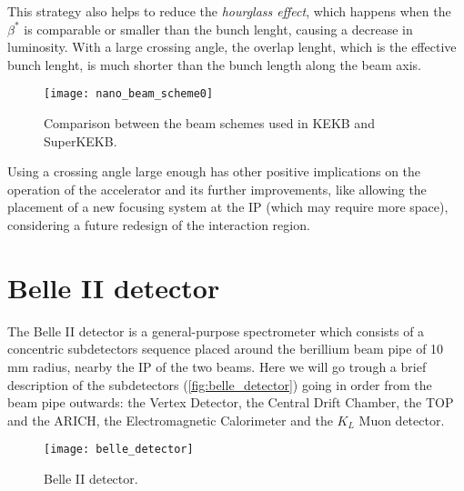 This strategy also helps to reduce the \textit{hourglass effect}, which happens when the $\beta^{*}$ is comparable or smaller than the bunch lenght, causing a decrease in luminosity. With a large crossing angle, the overlap lenght, which is the effective bunch lenght, is much shorter than the bunch length along the beam axis. \\


\begin{figure}[h!]
\centering
\texttt{[image: nano\_beam\_scheme0]}
\caption{Comparison between the beam schemes used in KEKB and SuperKEKB.}
\label{fig:beam_scheme_comparison}
\end{figure}

Using a crossing angle large enough has other positive implications on the operation of the accelerator and its further improvements, like allowing the placement of a new focusing system at the IP (which may require more space), considering a future redesign of the interaction region.

\begin{comment}
In~\autoref{fig:beampar} are reported the main machine parameters (default value) of the SuperKEKB accelerator.

\begin{figure}[h!]
\centering
\texttt{[image: beam\_par]}
\caption{Machine parameters of SuperKEKB. The mark ''*'' indicate values in the IP.}
\label{fig:beampar}
\end{figure}
\end{comment}


\section{Belle II detector}


The Belle II detector is a general-purpose spectrometer which consists of a concentric subdetectors sequence placed around the berillium beam pipe of 10 mm radius, nearby the IP of the two beams. Here we will go trough a brief description of the subdetectors (\autoref{fig:belle_detector}) going in order from the beam pipe outwards: the Vertex Detector, the Central Drift Chamber, the TOP and the ARICH, the Electromagnetic Calorimeter and the $K_{L}$ Muon detector.\\

\begin{figure}[h!]
\centering
\texttt{[image: belle\_detector]}
\caption{Belle II detector.}
\label{fig:belle_detector}
\end{figure}

